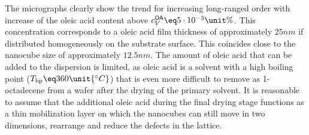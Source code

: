 \documentclass[\main/dresen_thesis.tex]{subfiles}
\begin{document}
  The micrographs clearly show the trend for increasing long-ranged order with increase of the oleic acid content above $c_V^\textsf{OA} \eq 5\cdot10^{-3} \unit{\%}$.
  This concentration corresponds to a oleic acid film thickness of approximately $25 \unit{nm}$ if distributed homogeneously on the substrate surface.
  This coincides close to the nanocube size of approximately $12.5 \unit{nm}$.
  The amount of oleic acid that can be added to the dispersion is limited, as oleic acid is a solvent with a high boiling point ($T_\mathrm{bp} \eq 360 \unit{^\circ C}$) that is even more difficult to remove as 1-octadecene from a wafer after the drying of the primary solvent.
  It is reasonable to assume that the additional oleic acid during the final drying stage functions as a thin mobilization layer on which the nanocubes can still move in two dimensions, rearrange and reduce the defects in the lattice.
\end{document}
